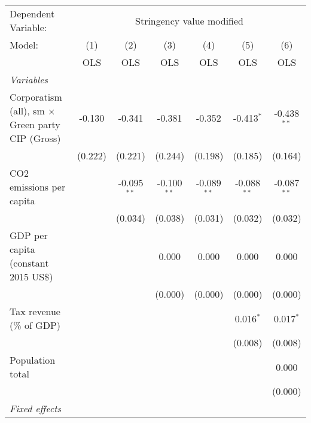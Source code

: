 
\begingroup
\centering
\begin{tabular}{lcccccc}
   \toprule
   Dependent Variable: & \multicolumn{6}{c}{Stringency value modified}\\
   Model:                                                  & (1)     & (2)           & (3)           & (4)           & (5)           & (6)\\  
                                                           &  OLS    & OLS           & OLS           & OLS           & OLS           & OLS\\  
   \midrule
   \emph{Variables}\\
   Corporatism (all), sm $\times$ Green party CIP (Gross)  & -0.130  & -0.341        & -0.381        & -0.352        & -0.413$^{*}$  & -0.438$^{**}$\\   
                                                           & (0.222) & (0.221)       & (0.244)       & (0.198)       & (0.185)       & (0.164)\\   
   CO2 emissions per capita                                &         & -0.095$^{**}$ & -0.100$^{**}$ & -0.089$^{**}$ & -0.088$^{**}$ & -0.087$^{**}$\\   
                                                           &         & (0.034)       & (0.038)       & (0.031)       & (0.032)       & (0.032)\\   
   GDP per capita (constant 2015 US\$)                     &         &               & 0.000         & 0.000         & 0.000         & 0.000\\   
                                                           &         &               & (0.000)       & (0.000)       & (0.000)       & (0.000)\\   
   Tax revenue (\% of GDP)                                 &         &               &               &               & 0.016$^{*}$   & 0.017$^{*}$\\   
                                                           &         &               &               &               & (0.008)       & (0.008)\\   
   Population total                                        &         &               &               &               &               & 0.000\\   
                                                           &         &               &               &               &               & (0.000)\\   
   \emph{Fixed effects}\\

\end{tabular}
